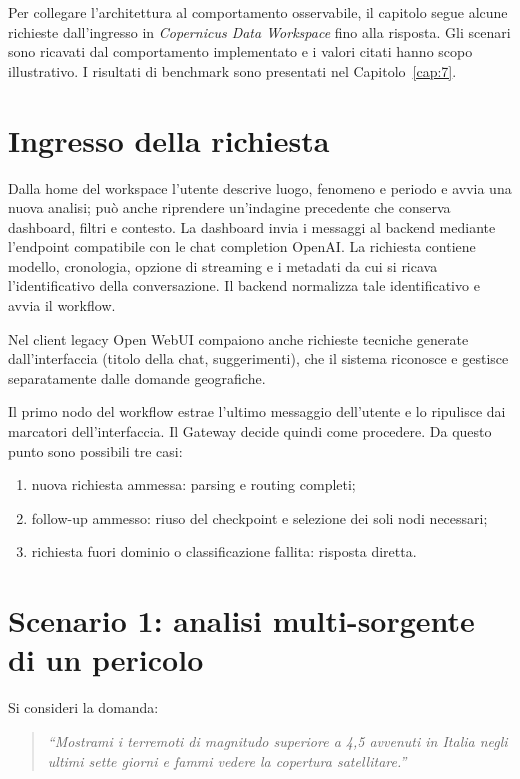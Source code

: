 Per collegare l'architettura al comportamento osservabile, il capitolo segue
alcune richieste dall'ingresso in \emph{Copernicus Data Workspace} fino alla
risposta. Gli scenari sono ricavati dal comportamento implementato e i valori
citati hanno scopo illustrativo. I risultati di benchmark sono presentati nel
Capitolo~\ref{cap:7}.

\section{Ingresso della richiesta}

Dalla home del workspace l'utente descrive luogo, fenomeno e periodo e avvia
una nuova analisi; può anche riprendere un'indagine precedente che conserva
dashboard, filtri e contesto. La dashboard invia i messaggi al backend mediante
l'endpoint compatibile con le chat completion OpenAI. La richiesta contiene
modello, cronologia, opzione di streaming e i metadati da cui si ricava
l'identificativo della conversazione. Il backend normalizza tale
identificativo e avvia il workflow.

Nel client legacy Open WebUI compaiono anche richieste tecniche generate
dall'interfaccia (titolo della chat, suggerimenti), che il sistema riconosce e
gestisce separatamente dalle domande geografiche.

Il primo nodo del workflow estrae l'ultimo messaggio dell'utente e lo ripulisce
dai marcatori dell'interfaccia. Il Gateway decide quindi come procedere. Da
questo punto sono possibili tre casi:

\begin{enumerate}
    \item nuova richiesta ammessa: parsing e routing completi;
    \item follow-up ammesso: riuso del checkpoint e selezione dei soli nodi
    necessari;
    \item richiesta fuori dominio o classificazione fallita: risposta diretta.
\end{enumerate}

\section{Scenario 1: analisi multi-sorgente di un pericolo}

Si consideri la domanda:

\begin{quote}
\emph{``Mostrami i terremoti di magnitudo superiore a 4,5 avvenuti in Italia
negli ultimi sette giorni e fammi vedere la copertura satellitare.''}
\end{quote}

